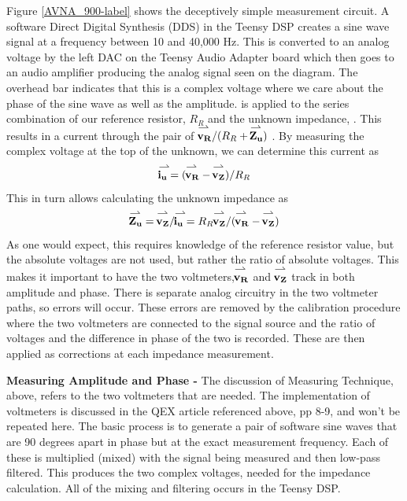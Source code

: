 %
Figure \ref{AVNA_900-label} shows the deceptively simple measurement circuit.  A software Direct Digital Synthesis (DDS) in the Teensy DSP creates a sine wave signal at a frequency between 10 and 40,000 Hz.  This is converted to an analog voltage by the left DAC on the Teensy Audio Adapter board which then goes to an audio amplifier producing the analog signal   seen on the diagram.
The overhead bar indicates that this is a complex voltage where we care about the phase of the sine wave as well as the amplitude.   is applied to the series combination of our reference resistor, \(R_R\) and the unknown impedance, .  This results in a current through the pair  of \(\vecr{$\mathbf{v_R}$}  /  (R_R +   \vecr{$\mathbf{Z_u}$})\) .  By measuring the complex voltage at the top of the unknown,  we can determine this current as
\begin{equation}
 \vecr{$\mathbf{i_u}$}=(\vecr{$\mathbf{v_R}$}-\vecr{$\mathbf{v_Z}$})/R_R
\end{equation}
 This in turn allows calculating the unknown impedance as
\begin{equation}
\vecr{$\mathbf{Z_u}$} =\vecr{$\mathbf{v_Z}$}/\vecr{$\mathbf{i_u}$}
                    =R_R\vecr{$\mathbf{v_Z}$}/(\vecr{$\mathbf{v_R}$}-\vecr{$\mathbf{v_Z}$})
\end{equation}
As one would expect, this requires knowledge of the reference resistor value, but the absolute voltages are not used, but rather the ratio of absolute voltages.  This makes it important to have the two voltmeters,\( \vecr{$\mathbf{v_R}$}\) and \( \vecr{$\mathbf{v_Z}$}\) track in both amplitude and phase.  There is separate analog circuitry in the two voltmeter paths, so errors will occur.  These errors are removed by the calibration procedure where the two voltmeters are connected to the signal source and the ratio  of voltages and the difference in phase of the two is recorded. These are then applied as corrections at each impedance measurement.

\textbf{Measuring Amplitude and Phase - }The discussion of Measuring Technique, above, refers to the two voltmeters that are needed.  The  implementation of voltmeters is discussed in the QEX article referenced above, pp 8-9,
and won't be repeated here.  The basic process is to generate a pair of software sine waves that are 90 degrees apart in phase but at the exact measurement frequency.  Each of these is multiplied (mixed) with the signal being measured and then low-pass filtered.  This produces the two complex voltages, needed for the impedance calculation.  All of the mixing and filtering occurs in the Teensy DSP.